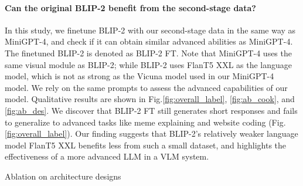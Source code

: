\paragraph{Can the original BLIP-2 benefit from the second-stage data?} 
In this study, we finetune BLIP-2 \citep{blip2} with our second-stage data in the same way as MiniGPT-4, and check if it can obtain similar advanced abilities as MiniGPT-4. The finetuned BLIP-2 is denoted as BLIP-2 FT. 
Note that MiniGPT-4 uses the same visual module as BLIP-2; while BLIP-2 uses FlanT5 XXL \citep{flanT5} as the language model, which is not as strong as the Vicuna \citep{vicuna2023} model used in our MiniGPT-4 model.
We rely on the same prompts to assess the advanced capabilities of our model. 
Qualitative results are shown in Fig.\ref{fig:overall_label}, \ref{fig:ab_cook}, and \ref{fig:ab_des}. We discover that BLIP-2 FT still generates short responses and fails to generalize to advanced tasks like meme explaining and website coding (Fig.\ref{fig:overall_label}). Our finding suggests that BLIP-2's relatively weaker language model FlanT5 XXL benefits less from such a small dataset, and highlights the effectiveness of a more advanced LLM in a VLM system.


\begin{table}[b]
\begin{minipage}{0.45\textwidth}
\centering
\caption{Ablation on architecture designs}
\end{minipage} \hfill
\begin{minipage}{0.45\textwidth}
\centering
\caption{Hallucination Evaluation}
\end{minipage}
\end{table}


